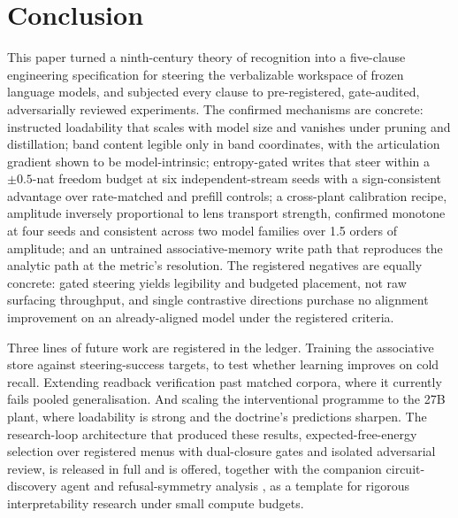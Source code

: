 \section{Conclusion}
\label{sec:conclusion}

This paper turned a ninth-century theory of recognition into a five-clause engineering specification for steering the verbalizable workspace of frozen language models, and subjected every clause to pre-registered, gate-audited, adversarially reviewed experiments. The confirmed mechanisms are concrete: instructed loadability that scales with model size and vanishes under pruning and distillation; band content legible only in band coordinates, with the articulation gradient shown to be model-intrinsic; entropy-gated writes that steer within a $\pm0.5$-nat freedom budget at six independent-stream seeds with a sign-consistent advantage over rate-matched and prefill controls; a cross-plant calibration recipe, amplitude inversely proportional to lens transport strength, confirmed monotone at four seeds and consistent across two model families over 1.5 orders of amplitude; and an untrained associative-memory write path that reproduces the analytic path at the metric's resolution. The registered negatives are equally concrete: gated steering yields legibility and budgeted placement, not raw surfacing throughput, and single contrastive directions purchase no alignment improvement on an already-aligned model under the registered criteria.

Three lines of future work are registered in the ledger. Training the associative store against steering-success targets, to test whether learning improves on cold recall. Extending readback verification past matched corpora, where it currently fails pooled generalisation. And scaling the interventional programme to the 27B plant, where loadability is strong and the doctrine's predictions sharpen. The research-loop architecture that produced these results, expected-free-energy selection over registered menus with dual-closure gates and isolated adversarial review, is released in full and is offered, together with the companion circuit-discovery agent \cite{Sathish2026ACD} and refusal-symmetry analysis \cite{Sathish2026Refusal}, as a template for rigorous interpretability research under small compute budgets.
